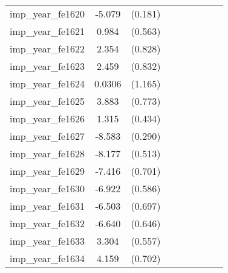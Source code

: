 {\begin{tabular}{l*{4}{cc}}
imp\_year\_fe1620&   -5.079\sym{***}&  (0.181)&                  &         &                  &         &                  &         \\
imp\_year\_fe1621&    0.984         &  (0.563)&                  &         &                  &         &                  &         \\
imp\_year\_fe1622&    2.354\sym{**} &  (0.828)&                  &         &                  &         &                  &         \\
imp\_year\_fe1623&    2.459\sym{**} &  (0.832)&                  &         &                  &         &                  &         \\
imp\_year\_fe1624&   0.0306         &  (1.165)&                  &         &                  &         &                  &         \\
imp\_year\_fe1625&    3.883\sym{***}&  (0.773)&                  &         &                  &         &                  &         \\
imp\_year\_fe1626&    1.315\sym{**} &  (0.434)&                  &         &                  &         &                  &         \\
imp\_year\_fe1627&   -8.583\sym{***}&  (0.290)&                  &         &                  &         &                  &         \\
imp\_year\_fe1628&   -8.177\sym{***}&  (0.513)&                  &         &                  &         &                  &         \\
imp\_year\_fe1629&   -7.416\sym{***}&  (0.701)&                  &         &                  &         &                  &         \\
imp\_year\_fe1630&   -6.922\sym{***}&  (0.586)&                  &         &                  &         &                  &         \\
imp\_year\_fe1631&   -6.503\sym{***}&  (0.697)&                  &         &                  &         &                  &         \\
imp\_year\_fe1632&   -6.640\sym{***}&  (0.646)&                  &         &                  &         &                  &         \\
imp\_year\_fe1633&    3.304\sym{***}&  (0.557)&                  &         &                  &         &                  &         \\
imp\_year\_fe1634&    4.159\sym{***}&  (0.702)&                  &         &                  &         &                  &         \\

\end{tabular}}
